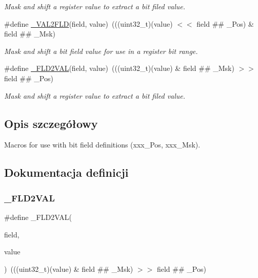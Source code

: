 \begin{DoxyCompactItemize}
\begin{DoxyCompactList}\small\item\em Mask and shift a register value to extract a bit filed value. \end{DoxyCompactList}\item 
\#define \hyperlink{group___c_m_s_i_s__core__bitfield_ga286e3b913dbd236c7f48ea70c8821f4e}{\+\_\+\+V\+A\+L2\+F\+LD}(field,  value)~(((uint32\+\_\+t)(value) $<$$<$ field \#\# \+\_\+\+Pos) \& field \#\# \+\_\+\+Msk)
\begin{DoxyCompactList}\small\item\em Mask and shift a bit field value for use in a register bit range. \end{DoxyCompactList}\item 
\#define \hyperlink{group___c_m_s_i_s__core__bitfield_ga139b6e261c981f014f386927ca4a8444}{\+\_\+\+F\+L\+D2\+V\+AL}(field,  value)~(((uint32\+\_\+t)(value) \& field \#\# \+\_\+\+Msk) $>$$>$ field \#\# \+\_\+\+Pos)
\begin{DoxyCompactList}\small\item\em Mask and shift a register value to extract a bit filed value. \end{DoxyCompactList}\end{DoxyCompactItemize}


\subsection{Opis szczegółowy}
Macros for use with bit field definitions (xxx\+\_\+\+Pos, xxx\+\_\+\+Msk). 



\subsection{Dokumentacja definicji}
\mbox{\label{group___c_m_s_i_s__core__bitfield_ga139b6e261c981f014f386927ca4a8444}} 
\subsubsection{\texorpdfstring{\+\_\+\+F\+L\+D2\+V\+AL}{\_FLD2VAL}\hspace{0.1cm}{\footnotesize\ttfamily [1/12]}}
{\footnotesize\ttfamily \#define \+\_\+\+F\+L\+D2\+V\+AL(\begin{DoxyParamCaption}\item[{}]{field,  }\item[{}]{value }\end{DoxyParamCaption})~(((uint32\+\_\+t)(value) \& field \#\# \+\_\+\+Msk) $>$$>$ field \#\# \+\_\+\+Pos)}



